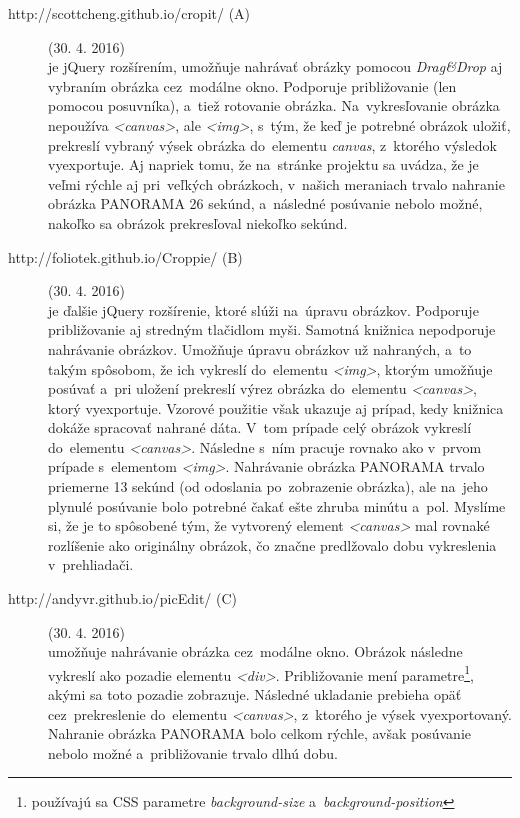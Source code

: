 \begin{description}
	
	\item[http://scottcheng.github.io/cropit/ (A)] (30. 4. 2016)\\
	je jQuery rozšírením, umožňuje nahrávať obrázky pomocou \emph{Drag\&Drop} aj vybraním obrázka cez~modálne okno. Podporuje približovanie (len pomocou posuvníka), a~tiež rotovanie obrázka. Na~vykresľovanie obrázka nepoužíva \emph{<canvas>}, ale \emph{<img>}, s~tým, že keď je potrebné obrázok uložiť, prekreslí vybraný výsek obrázka do~elementu \emph{canvas}, z~ktorého výsledok vyexportuje. Aj napriek tomu, že na~stránke projektu sa uvádza, že je veľmi rýchle aj pri~veľkých obrázkoch, v~našich meraniach trvalo nahranie obrázka PANORAMA 26 sekúnd, a~následné posúvanie nebolo možné, nakoľko sa obrázok prekresľoval niekoľko sekúnd.
	
	
	\item[http://foliotek.github.io/Croppie/ (B)] (30. 4. 2016)\\
	je ďalšie jQuery rozšírenie, ktoré slúži na~úpravu obrázkov. Podporuje približovanie aj stredným tlačidlom myši. Samotná knižnica nepodporuje nahrávanie obrázkov. Umožňuje úpravu obrázkov už nahraných, a~to takým spôsobom, že ich vykreslí do~elementu \emph{<img>}, ktorým umožňuje posúvať a~pri uložení prekreslí výrez obrázka do~elementu \emph{<canvas>}, ktorý vyexportuje. Vzorové použitie však ukazuje aj prípad, kedy knižnica dokáže spracovať nahrané dáta. V~tom prípade celý obrázok vykreslí do~elementu \emph{<canvas>}. Následne s~ním pracuje rovnako ako v~prvom prípade s~elementom \emph{<img>}. Nahrávanie obrázka PANORAMA trvalo priemerne 13 sekúnd (od odoslania po~zobrazenie obrázka), ale na~jeho plynulé posúvanie bolo potrebné čakať ešte zhruba minútu a~pol. Myslíme si, že je to spôsobené tým, že vytvorený element \emph{<canvas>} mal rovnaké rozlíšenie ako originálny obrázok, čo značne predlžovalo dobu vykreslenia v~prehliadači.
	
	
	\item[http://andyvr.github.io/picEdit/ (C)] (30. 4. 2016)\\
	umožňuje nahrávanie obrázka cez~modálne okno. Obrázok následne vykreslí ako pozadie elementu \emph{<div>}. Približovanie mení parametre\footnote{používajú sa CSS parametre \emph{background-size} a~\emph{background-position}}, akými sa toto pozadie zobrazuje. Následné ukladanie prebieha opäť cez~prekreslenie do~elementu \emph{<canvas>}, z~ktorého je výsek vyexportovaný. Nahranie obrázka PANORAMA bolo celkom rýchle, avšak posúvanie nebolo možné a~približovanie trvalo dlhú dobu.
	

\end{description}
